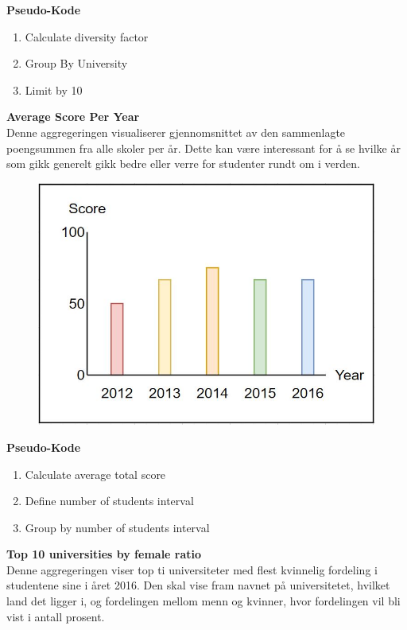 \textbf{Pseudo-Kode}
\begin{enumerate}
  \item Calculate diversity factor
  \item Group By University
  \item Limit by 10
\end{enumerate}

\pagebreak
\textbf{Average Score Per Year}\\
Denne aggregeringen visualiserer gjennomsnittet av den sammenlagte poengsummen fra alle skoler per år. Dette kan være interessant for å se hvilke år som gikk generelt gikk bedre eller verre for studenter rundt om i verden.

\FigureCounter
\begin{figure}[H]
  \includegraphics[scale=0.5]{images/milepael4/averageScorePerYear.JPG}
\end{figure}

\textbf{Pseudo-Kode}
\begin{enumerate}
  \item Calculate average total score
  \item Define number of students interval
  \item Group by number of students interval
\end{enumerate}

\pagebreak
\textbf{Top 10 universities by female ratio}\\
Denne aggregeringen viser top ti universiteter med flest kvinnelig fordeling i studentene sine i året 2016. Den skal vise fram navnet på universitetet, hvilket land det ligger i, og fordelingen mellom menn og kvinner, hvor fordelingen vil bli vist i antall prosent.

